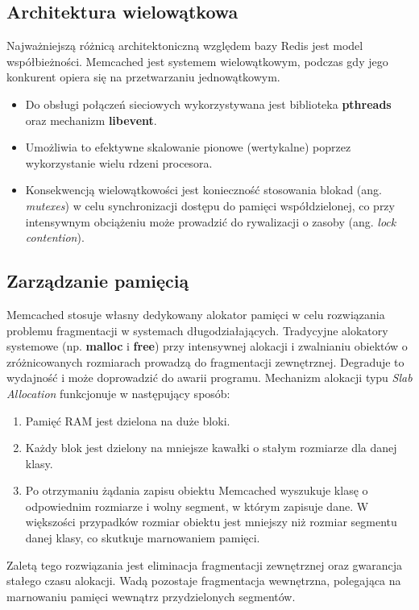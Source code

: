 \subsection{Architektura wielowątkowa}
Najważniejszą różnicą architektoniczną względem bazy Redis jest model współbieżności. Memcached jest systemem wielowątkowym, podczas gdy jego konkurent opiera się na przetwarzaniu jednowątkowym.
\begin{itemize}
    \item Do obsługi połączeń sieciowych wykorzystywana jest biblioteka \textbf{pthreads} oraz mechanizm \textbf{libevent}.
    \item Umożliwia to efektywne skalowanie pionowe (wertykalne) poprzez wykorzystanie wielu rdzeni procesora.
    \item Konsekwencją wielowątkowości jest konieczność stosowania blokad (ang. \emph{mutexes}) w celu synchronizacji dostępu do pamięci współdzielonej, co przy intensywnym obciążeniu może prowadzić do rywalizacji o zasoby (ang. \emph{lock contention}).
\end{itemize}
\subsection{Zarządzanie pamięcią}
Memcached stosuje własny dedykowany alokator pamięci w celu rozwiązania problemu fragmentacji w systemach długodziałających. Tradycyjne alokatory systemowe (np. \textbf{malloc} i \textbf{free}) przy intensywnej alokacji i zwalnianiu obiektów o zróżnicowanych rozmiarach prowadzą do fragmentacji zewnętrznej. Degraduje to wydajność i może doprowadzić do awarii programu. Mechanizm alokacji typu \emph{Slab Allocation} funkcjonuje w następujący sposób:
\begin{enumerate}
    \item Pamięć RAM jest dzielona na duże bloki.
    \item Każdy blok jest dzielony na mniejsze kawałki o stałym rozmiarze dla danej klasy.
    \item Po otrzymaniu żądania zapisu obiektu Memcached wyszukuje klasę o odpowiednim rozmiarze i wolny segment, w którym zapisuje dane. W większości przypadków rozmiar obiektu jest mniejszy niż rozmiar segmentu danej klasy, co skutkuje marnowaniem pamięci.
\end{enumerate}
Zaletą tego rozwiązania jest eliminacja fragmentacji zewnętrznej oraz gwarancja stałego czasu alokacji. Wadą pozostaje fragmentacja wewnętrzna, polegająca na marnowaniu pamięci wewnątrz przydzielonych segmentów.
